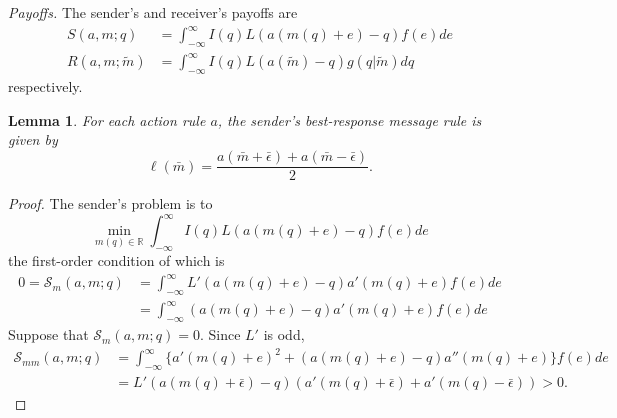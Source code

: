 \documentclass[12pt]{article}
\newtheorem{lemma}{Lemma}
\begin{document}
\begin{landscape}
\noindent\textit{Payoffs.} The sender's and receiver's payoffs are 
\begin{align}
S(a,m;q)&=\int_{-\infty}^{\infty}{I(q)L(a(m(q)+e)-q)f(e)de}\\
R(a,m;\tilde{m})&=\int_{-\infty}^{\infty}{I(q)L(a(\tilde{m})-q)g(q|\tilde{m})dq}
\end{align}
respectively.

\begin{lemma}\label{lemma:message}
For each action rule $a$, the sender's best-response message rule is given by
\begin{equation}
\ell(\bar{m})=\frac{a(\bar{m}+\bar{\epsilon})+a(\bar{m}-\bar{\epsilon})}{2}.
\end{equation}
\end{lemma}
\begin{proof}
The sender's problem is to
\begin{equation}
\min_{m(q)\in\mathbb{R}}\int_{-\infty}^{\infty}{I(q)L(a(m(q)+e)-q)f(e)de}
\end{equation}
the first-order condition of which is
\begin{align}
0=\mathcal{S}_{m}(a,m;q)&=\int_{-\infty}^{\infty}{L'(a(m(q)+e)-q)a'(m(q)+e)f(e)de}\\
&=\int_{-\infty}^{\infty}{(a(m(q)+e)-q)a'(m(q)+e)f(e)de}
\end{align}
Suppose that $\mathcal{S}_{m}(a,m;q)=0$. Since $L'$ is odd, 
\begin{align}
\mathcal{S}_{mm}(a,m;q)&=\int_{-\infty}^{\infty}{\{a'(m(q)+e)^2+(a(m(q)+e)-q)a''(m(q)+e)\}f(e)de}\\
&=L'(a(m(q)+\bar{\epsilon})-q)(a'(m(q)+\bar{\epsilon})+a'(m(q)-\bar{\epsilon}))>0.
\end{align}
\end{proof}


\end{landscape}
\end{document}
